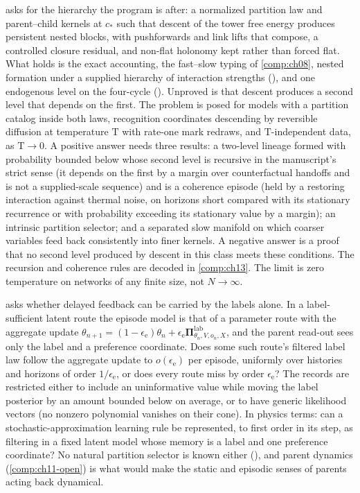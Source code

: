  asks for the hierarchy the program is after: a normalized partition law
and parent--child kernels at $c_*$ such that descent of the tower free energy produces persistent nested
blocks, with pushforwards and link lifts that compose, a controlled closure residual, and non-flat
holonomy kept rather than forced flat. What holds is the exact accounting, the fast--slow typing of
\cref{comp:ch08}, nested formation under a supplied hierarchy of interaction strengths
(), and one endogenous level on the four-cycle
(). Unproved is that descent produces a second level that
depends on the first. The problem is posed for models with a partition catalog inside both laws,
recognition coordinates descending by reversible diffusion at temperature $\mathrm T$ with rate-one mark
redraws, and $\mathrm T$-independent data, as $\mathrm T\to0$. A positive answer needs three results: a
two-level lineage formed with probability bounded below whose second level is recursive in the
manuscript's strict sense (it depends on the first by a margin over counterfactual handoffs and is not a
supplied-scale sequence) and is a coherence episode (held by a restoring interaction against thermal
noise, on horizons short compared with its stationary recurrence or with probability exceeding its
stationary value by a margin); an intrinsic partition selector; and a separated slow manifold on which
coarser variables feed back consistently into finer kernels. A negative answer is a proof that no second
level produced by descent in this class meets these conditions. The recursion and coherence rules are
decoded in \cref{comp:ch13}. The limit is zero temperature on networks of any finite size, not
$N\to\infty$.

 asks whether delayed feedback can be carried by the labels alone.
In a label-sufficient latent route the episode model is that of a parameter route with the aggregate
update
$\theta_{n+1}=(1-\epsilon_{\mathrm e})\theta_n+\epsilon_{\mathrm e}\boldsymbol\Pi^{\mathrm{lab}}_{\theta_n,V,o_n,X}$,
and the parent read-out sees only the label and a preference coordinate. Does some such route's
filtered label law follow the aggregate update to $o(\epsilon_{\mathrm e})$ per episode, uniformly over
histories and horizons of order $1/\epsilon_{\mathrm e}$, or does every route miss by order
$\epsilon_{\mathrm e}$? The records are restricted either to include an uninformative value while moving
the label posterior by an amount bounded below on average, or to have generic likelihood vectors (no
nonzero polynomial vanishes on their cone). In physics terms: can a stochastic-approximation learning
rule be represented, to first order in its step, as filtering in a fixed latent model whose memory is a
label and one preference coordinate? No natural partition selector is known either
(), and parent dynamics (\cref{comp:ch11-open}) is what would make the
static and episodic senses of parents acting back dynamical.

